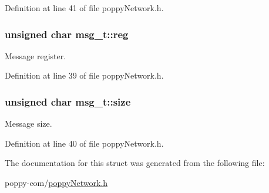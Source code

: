 \-Definition at line 41 of file poppy\-Network.\-h.

\hypertarget{structmsg__t_a0aef01fbaf575c639d82d5beee92c421}{
\subsubsection[{reg}]{\setlength{\rightskip}{0pt plus 5cm}unsigned char {\bf msg\-\_\-t\-::reg}}}\label{structmsg__t_a0aef01fbaf575c639d82d5beee92c421}
\-Message register. 

\-Definition at line 39 of file poppy\-Network.\-h.

\hypertarget{structmsg__t_a3736f2ca203e665223b225ca07def9b5}{
\subsubsection[{size}]{\setlength{\rightskip}{0pt plus 5cm}unsigned char {\bf msg\-\_\-t\-::size}}}\label{structmsg__t_a3736f2ca203e665223b225ca07def9b5}
\-Message size. 

\-Definition at line 40 of file poppy\-Network.\-h.



\-The documentation for this struct was generated from the following file\-:\begin{DoxyCompactItemize}
\item 
poppy-\/com/\hyperlink{poppy_network_8h}{poppy\-Network.\-h}\end{DoxyCompactItemize}
